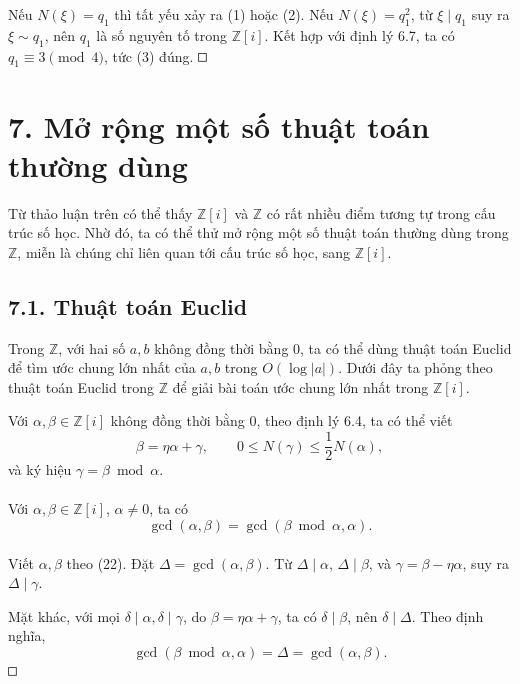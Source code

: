 \documentclass[11pt]{article}
\newcommand{\square}{\mathord{\vcenter{\hrule height .5pt
  \hbox{\vrule width .5pt height 5pt\kern5pt\vrule width .5pt}
  \hrule height .5pt}}}
\begin{document}
Nếu \(N(\xi)=q_1\) thì tất yếu xảy ra (1) hoặc (2). Nếu
\(N(\xi)=q_1^2\), từ \(\xi\mid q_1\) suy ra \(\xi\sim q_1\), nên \(q_1\) là
số nguyên tố trong \(\mathbb Z[i]\). Kết hợp với định lý 6.7, ta có
\(q_1\equiv3\pmod4\), tức (3) đúng. \(\square\)

\section*{7. Mở rộng một số thuật toán thường dùng}

Từ thảo luận trên có thể thấy \(\mathbb Z[i]\) và \(\mathbb Z\) có rất nhiều
điểm tương tự trong cấu trúc số học. Nhờ đó, ta có thể thử mở rộng một số
thuật toán thường dùng trong \(\mathbb Z\), miễn là chúng chỉ liên quan tới
cấu trúc số học, sang \(\mathbb Z[i]\).

\subsection*{7.1. Thuật toán Euclid}

Trong \(\mathbb Z\), với hai số \(a,b\) không đồng thời bằng \(0\), ta có thể
dùng thuật toán Euclid để tìm ước chung lớn nhất của \(a,b\) trong
\(O(\log|a|)\). Dưới đây ta phỏng theo thuật toán Euclid trong \(\mathbb Z\)
để giải bài toán ước chung lớn nhất trong \(\mathbb Z[i]\).

Với \(\alpha,\beta\in\mathbb Z[i]\) không đồng thời bằng \(0\), theo định lý
6.4, ta có thể viết
\[
  \beta=\eta\alpha+\gamma,\qquad 0\le N(\gamma)\le \frac12N(\alpha),
\tag{22}
\]
và ký hiệu \(\gamma=\beta\bmod\alpha\).

\paragraph{}
Với \(\alpha,\beta\in\mathbb Z[i]\), \(\alpha\ne0\), ta có
\[
  \gcd(\alpha,\beta)=\gcd(\beta\bmod\alpha,\alpha).
\]

\paragraph{}
Viết \(\alpha,\beta\) theo (22). Đặt \(\Delta=\gcd(\alpha,\beta)\). Từ
\(\Delta\mid\alpha\), \(\Delta\mid\beta\), và \(\gamma=\beta-\eta\alpha\), suy
ra \(\Delta\mid\gamma\).

Mặt khác, với mọi \(\delta\mid\alpha,\delta\mid\gamma\), do
\(\beta=\eta\alpha+\gamma\), ta có \(\delta\mid\beta\), nên \(\delta\mid
\Delta\). Theo định nghĩa,
\[
  \gcd(\beta\bmod\alpha,\alpha)=\Delta=\gcd(\alpha,\beta).
\]
\(\square\)
\end{document}
